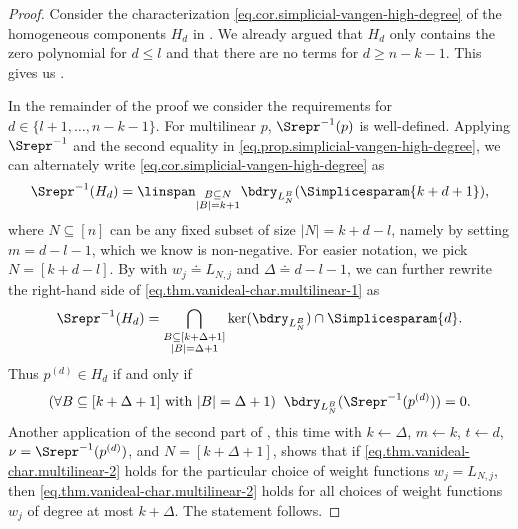 \documentclass{toc}
\begin{document}
\begin{proof}
Consider the characterization \eqref{eq.cor.simplicial-vangen-high-degree} of the homogeneous components $H_d$ in . We already argued that $H_d$ only contains the zero polynomial for $d \le l$ and that there are no terms for $d \ge n-k-1$. This gives us .

In the remainder of the proof we consider the requirements for $d \in \{l+1, \dots, n-k-1\}$. For multilinear $p$, $\Srepr^{-1}(p)$ is well-defined. Applying $\Srepr^{-1}$ and the second equality in \eqref{eq.prop.simplicial-vangen-high-degree}, we can alternately write \eqref{eq.cor.simplicial-vangen-high-degree} as
\begin{equation}\label{eq.thm.vanideal-char.multilinear-1}
\Srepr^{-1}(H_d) = \linspan_{\substack{B \subseteq N \\ |B|=k+1}} \bdry_{L_N^B}(\Simplicesparam{k+d+1}),
\end{equation}
where $N \subseteq [n]$ can be any fixed subset of size $|N|=k+d-l$, namely by setting $m=d-l-1$, which we know is non-negative. For easier notation, we pick $N = [k+d-l]$. By  with $w_j \doteq L_{N,j}$ and $\Delta \doteq d-l-1$, we can further rewrite the right-hand side of \eqref{eq.thm.vanideal-char.multilinear-1} as
\[
\Srepr^{-1}(H_d) = \bigcap_{\substack{B \subseteq [k+\Delta+1] \\ |B|=\Delta+1}} \ker(\bdry_{L_N^B}) \cap \Simplicesparam{d}.
\]
Thus $p^{(d)} \in H_d$ if and only if 
\begin{equation}\label{eq.thm.vanideal-char.multilinear-2}
(\forall B \subseteq [k+\Delta+1] \textrm{ with }|B|=\Delta+1) \; \;  
\bdry_{L_N^B}(\Srepr^{-1}(p^{(d)}))=0.
\end{equation}
Another application of the second part of , this time with $k \gets \Delta$, $m \gets k$, $t \gets d$, $\nu=\Srepr^{-1}(p^{(d)})$, and $N=[k+\Delta+1]$, shows that if \eqref{eq.thm.vanideal-char.multilinear-2} holds for the particular choice of weight functions $w_j = L_{N,j}$, then \eqref{eq.thm.vanideal-char.multilinear-2} holds for all choices of weight functions $w_j$ of degree at most $k+\Delta$. The statement follows.
\end{proof}
\end{document}

